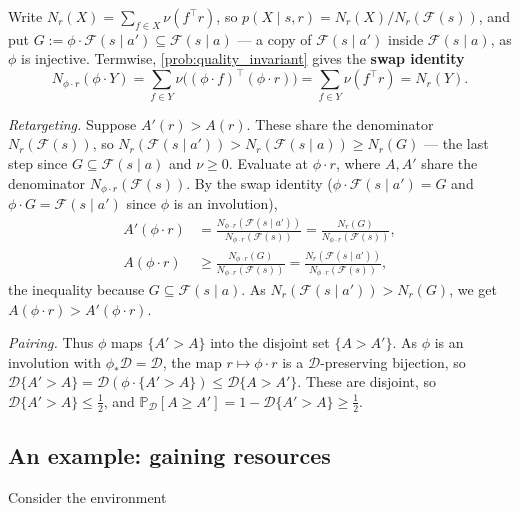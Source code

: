 \documentclass[11pt]{article}
\newcommand{\Prob}{\mathbb{P}}
\newcommand{\Dist}{\mathcal{D}}    %
\newcommand{\F}{\mathcal{F}}       %
\begin{document}
\begin{solution}
Write $N_r(X) = \sum_{f\in X}\nu(f^\top r)$, so $p(X\mid s,r) = N_r(X)/N_r(\F(s))$, and put
$G := \phi\cdot\F(s\mid a') \subseteq \F(s\mid a)$ --- a copy of $\F(s\mid a')$ inside $\F(s\mid a)$,
as $\phi$ is injective. Termwise, \cref{prob:quality_invariant} gives the \textbf{swap identity}
$$
N_{\phi\cdot r}(\phi\cdot Y) = \sum_{f\in Y}\nu\bigl((\phi\cdot f)^\top(\phi\cdot r)\bigr) = \sum_{f\in Y}\nu(f^\top r) = N_r(Y).
$$

\emph{Retargeting.} Suppose $A'(r) > A(r)$. These share the denominator $N_r(\F(s))$, so
$N_r(\F(s\mid a')) > N_r(\F(s\mid a)) \ge N_r(G)$ --- the last step since $G\subseteq\F(s\mid a)$ and
$\nu\ge0$. Evaluate at $\phi\cdot r$, where $A, A'$ share the denominator $N_{\phi\cdot r}(\F(s))$.
By the swap identity ($\phi\cdot\F(s\mid a') = G$ and $\phi\cdot G = \F(s\mid a')$ since $\phi$ is an involution),
\begin{align*}
A'(\phi\cdot r) &= \frac{N_{\phi\cdot r}(\F(s\mid a'))}{N_{\phi\cdot r}(\F(s))} = \frac{N_r(G)}{N_{\phi\cdot r}(\F(s))},
\\
A(\phi\cdot r) &\ge \frac{N_{\phi\cdot r}(G)}{N_{\phi\cdot r}(\F(s))} = \frac{N_r(\F(s\mid a'))}{N_{\phi\cdot r}(\F(s))},
\end{align*}
the inequality because $G\subseteq\F(s\mid a)$. As $N_r(\F(s\mid a')) > N_r(G)$, we get
$A(\phi\cdot r) > A'(\phi\cdot r)$.

\emph{Pairing.} Thus $\phi$ maps $\{A' > A\}$ into the disjoint set $\{A > A'\}$. As $\phi$ is an
involution with $\phi_*\Dist = \Dist$, the map $r\mapsto\phi\cdot r$ is a $\Dist$-preserving
bijection, so $\Dist\{A' > A\} = \Dist(\phi\cdot\{A' > A\}) \le \Dist\{A > A'\}$. These are disjoint,
so $\Dist\{A' > A\}\le\tfrac12$, and $\Prob_\Dist[A\ge A'] = 1 - \Dist\{A' > A\}\ge\tfrac12$.
\end{solution}

\subsection*{An example: gaining resources}

Consider the environment

\begin{center}
\end{center}
\end{document}
